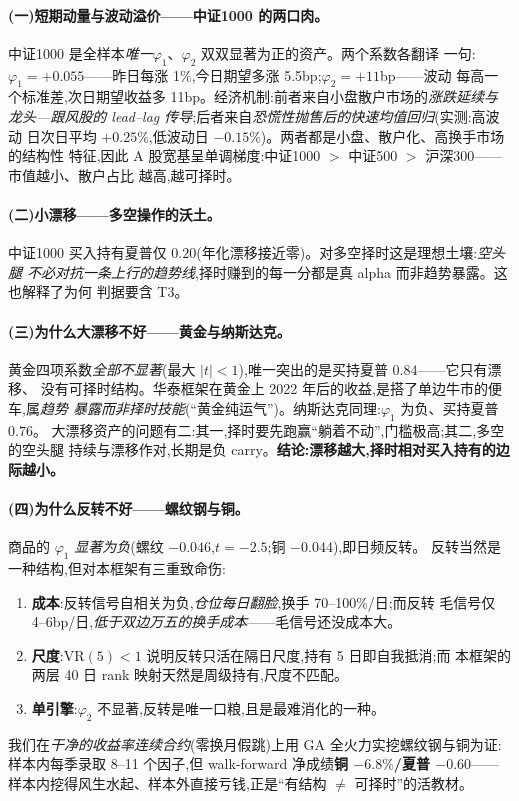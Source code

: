 \documentclass[11pt,a4paper,fontset=mac]{ctexart}
\begin{document}
\paragraph{(一)短期动量与波动溢价——中证1000 的两口肉。}
中证1000 是全样本\emph{唯一}$\varphi_1$、$\varphi_2$ 双双显著为正的资产。两个系数各翻译
一句:$\varphi_1=+0.055$——昨日每涨 1\%,今日期望多涨 5.5bp;$\varphi_2=+11$bp——波动
每高一个标准差,次日期望收益多 11bp。经济机制:前者来自小盘散户市场的\emph{涨跌延续与
龙头—跟风股的 lead--lag 传导};后者来自\emph{恐慌性抛售后的快速均值回归}(实测:高波动
日次日平均 $+0.25\%$,低波动日 $-0.15\%$)。两者都是小盘、散户化、高换手市场的结构性
特征,因此 A 股宽基呈单调梯度:中证1000 $>$ 中证500 $>$ 沪深300——市值越小、散户占比
越高,越可择时。

\paragraph{(二)小漂移——多空操作的沃土。}
中证1000 买入持有夏普仅 $0.20$(年化漂移接近零)。对多空择时这是理想土壤:\emph{空头腿
不必对抗一条上行的趋势线},择时赚到的每一分都是真 alpha 而非趋势暴露。这也解释了为何
判据要含 T3。

\paragraph{(三)为什么大漂移不好——黄金与纳斯达克。}
黄金四项系数\emph{全部不显著}(最大 $|t|<1$),唯一突出的是买持夏普 $0.84$——它只有漂移、
没有可择时结构。华泰框架在黄金上 2022 年后的收益,是搭了单边牛市的便车,属\emph{趋势
暴露而非择时技能}(``黄金纯运气'')。纳斯达克同理:$\varphi_1$ 为负、买持夏普 $0.76$。
大漂移资产的问题有二:其一,择时要先跑赢``躺着不动'',门槛极高;其二,多空的空头腿
持续与漂移作对,长期是负 carry。\textbf{结论:漂移越大,择时相对买入持有的边际越小。}

\paragraph{(四)为什么反转不好——螺纹钢与铜。}
商品的 $\varphi_1$ \emph{显著为负}(螺纹 $-0.046$,$t=-2.5$;铜 $-0.044$),即日频反转。
反转当然是一种结构,但对本框架有三重致命伤:
\begin{enumerate}
\item \textbf{成本}:反转信号自相关为负,\emph{仓位每日翻脸},换手 70--100\%/日;而反转
毛信号仅 4--6bp/日,\emph{低于双边万五的换手成本}——毛信号还没成本大。
\item \textbf{尺度}:$\mathrm{VR}(5)<1$ 说明反转只活在隔日尺度,持有 5 日即自我抵消;而
本框架的两层 40 日 rank 映射天然是周级持有,尺度不匹配。
\item \textbf{单引擎}:$\varphi_2$ 不显著,反转是唯一口粮,且是最难消化的一种。
\end{enumerate}
我们在\emph{干净的收益率连续合约}(零换月假跳)上用 GA 全火力实挖螺纹钢与铜为证:
样本内每季录取 8--11 个因子,但 walk-forward 净成绩\textbf{铜 $-6.8\%$/夏普 $-0.60$}——
样本内挖得风生水起、样本外直接亏钱,正是``有结构 $\ne$ 可择时''的活教材。
\end{document}
